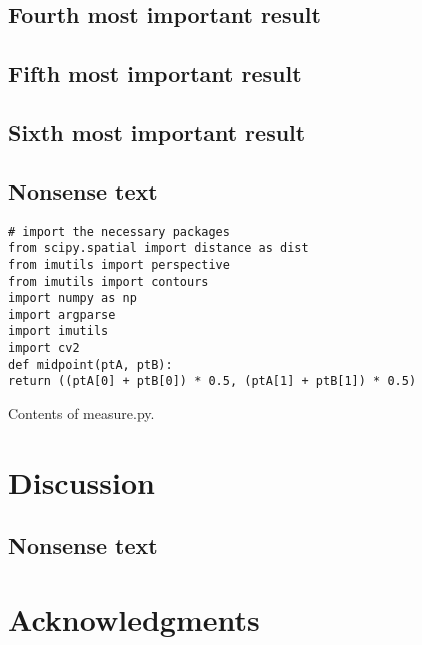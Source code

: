 \documentclass[11pt,letterpaper]{article}
\newenvironment{code}{\captionsetup{type=listing}}{}
\begin{document}
\subsection*{Fourth most important result}
\label{sec:orgcbc6d76}



\subsection*{Fifth most important result}
\label{sec:org24f5c6a}



\subsection*{Sixth most important result}
\label{sec:org35953aa}

\subsection*{Nonsense text}
\label{sec:org3914217}
\lipsum[1-10]

\begin{singlespace}
\begin{code}{}
\label{lst:measureSize}
\begin{verbatim}
# import the necessary packages
from scipy.spatial import distance as dist
from imutils import perspective
from imutils import contours
import numpy as np
import argparse
import imutils
import cv2
def midpoint(ptA, ptB):
return ((ptA[0] + ptB[0]) * 0.5, (ptA[1] + ptB[1]) * 0.5)
\end{verbatim}
\caption{Contents of measure.py. \label{lst:measureSize}}
\end{code}
\end{singlespace}

\section*{Discussion}
\label{sec:org829f3bb}
\subsection*{Nonsense text}
\label{sec:org19410c9}
\lipsum[1-10]


\section*{Acknowledgments}
\label{sec:orgb3464e4}
\subsection*{}
\label{sec:org5373475}
\newpage



\subsection*{}
\label{sec:org9a6984a}
\newpage
\listoftables
\end{document}
